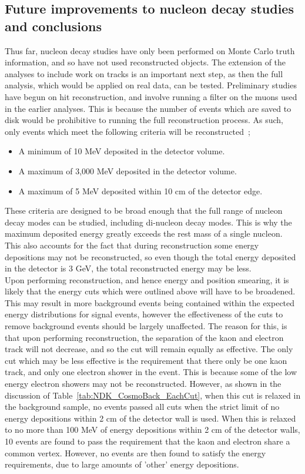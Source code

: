\subsection{Future improvements to nucleon decay studies and conclusions} \label{sec:NDKImprov}
Thus far, nucleon decay studies have only been performed on Monte Carlo truth information, and so have not used reconstructed objects. The extension of the analyses to include work on tracks is an important next step, as then the full analysis, which would be applied on real data, can be tested. Preliminary studies have begun on hit reconstruction, and involve running a filter on the muons used in the earlier analyses. This is because the number of events which are saved to disk would be prohibitive to running the full reconstruction process. As such, only events which meet the following criteria will be reconstructed~\citep{CosmoJanCollabMeeting};
\begin{itemize}
\item A minimum of 10 MeV deposited in the detector volume.
\item A maximum of 3,000 MeV deposited in the detector volume.
\item A maximum of 5 MeV deposited within 10 cm of the detector edge.
\end{itemize}
These criteria are designed to be broad enough that the full range of nucleon decay modes can be studied, including di-nucleon decay modes. This is why the maximum deposited energy greatly exceeds the rest mass of a single nucleon. This also accounts for the fact that during reconstruction some energy depositions may not be reconstructed, so even though the total energy deposited in the detector is 3 GeV, the total reconstructed energy may be less. \\

Upon performing reconstruction, and hence energy and position smearing, it is likely that the energy cuts which were outlined above will have to be broadened. This may result in more background events being contained within the expected energy distributions for signal events, however the effectiveness of the cuts to remove background events should be largely unaffected. The reason for this, is that upon performing reconstruction, the separation of the kaon and electron track will not decrease, and so the cut will remain equally as effective. The only cut which may be less effective is the requirement that there only be one kaon track, and only one electron shower in the event. This is because some of the low energy electron showers may not be reconstructed. However, as shown in the discussion of Table~\ref{tab:NDK_CosmoBack_EachCut}, when this cut is relaxed in the background sample, no events passed all cuts when the strict limit of no energy depositions within 2 cm of the detector wall is used. When this is relaxed to no more than 100 MeV of energy depositions within 2 cm of the detector walls, 10 events are found to pass the requirement that the kaon and electron share a common vertex. However, no events are then found to satisfy the energy requirements, due to large amounts of 'other' energy depositions. \\


